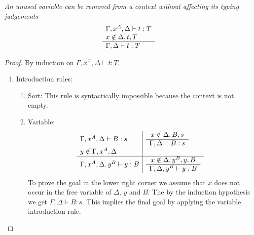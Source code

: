 \begin{lemma}
    \emph{An unused variable can be removed from a context without affecting its
    typing judgements}
    $$
    \begin{array}{l} 
        \Gamma,x^A,\Delta \vdash t: T
        \\
        x \notin \Delta, t, T
     \\ \hline 
        \Gamma, \Delta \vdash t : T
    \end{array}
    $$

    \begin{proof}
        {\newcommand{\goal}[3]{
            \ruleh {
                x \notin #1, #2, #3
            }
            {
                \Gamma,#1 \vdash #2 : #3
            }
         }
        By induction on $\Gamma,x^A,\Delta \vdash t: T$.

        \begin{enumerate}
            \item Introduction rules:
            \begin{enumerate}
                \item Sort: This rule is syntactically impossible because the
                    context is not empty.

                \item Variable:
                $$
                \begin{array}{l|l}
                    \Gamma,x^A,\Delta \vdash B : s
                    &
                    \goal \Delta B s
                    \\
                    y \notin \Gamma,x^A,\Delta
                    \\
                    \hline
                    \Gamma,x^A,\Delta,y^B \vdash y :B
                    &
                    \goal {\Delta,y^B} y B
                \end{array}
                $$
                To prove the goal in the lower right corner we assume that $x$
                    does not occur in the free variable of $\Delta$, $y$ and
                    $B$. The by the induction hypothesis we get $\Gamma,\Delta
                    \vdash B: s$. This implies the final goal by applying the
                    variable introduction rule.


\end{enumerate}
\end{enumerate}}
\end{proof}
\end{lemma}
